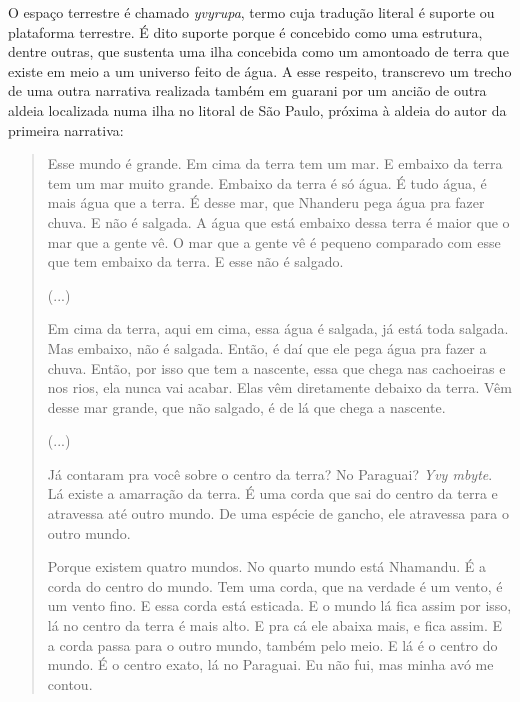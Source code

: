 O espaço terrestre é chamado \emph{yvyrupa}, termo cuja tradução literal
é suporte ou plataforma terrestre. É dito suporte porque é concebido
como uma estrutura, dentre outras, que sustenta uma ilha concebida como
um amontoado de terra que existe em meio a um universo feito de água. A
esse respeito, transcrevo um trecho de uma outra narrativa realizada
também em guarani por um ancião de outra aldeia localizada numa ilha no
litoral de São Paulo, próxima à aldeia do autor da primeira narrativa:

\begin{quote}
Esse mundo é grande. Em cima da terra tem um mar. E embaixo da terra tem
um mar muito grande. Embaixo da terra é só água. É tudo água, é mais
água que a terra. É desse mar, que Nhanderu pega água pra fazer chuva. E
não é salgada. A água que está embaixo dessa terra é maior que o mar que
a gente vê. O mar que a gente vê é pequeno comparado com esse que tem
embaixo da terra. E esse não é salgado.

(...)

Em cima da terra, aqui em cima, essa água é salgada, já está toda
salgada. Mas embaixo, não é salgada. Então, é daí que ele pega água pra
fazer a chuva. Então, por isso que tem a nascente, essa que chega nas
cachoeiras e nos rios, ela nunca vai acabar. Elas vêm diretamente
debaixo da terra. Vêm desse mar grande, que não salgado, é de lá que
chega a nascente.

(...)

Já contaram pra você sobre o centro da terra? No Paraguai? \emph{Yvy
mbyte}. Lá existe a amarração da terra. É uma corda que sai do centro da
terra e atravessa até outro mundo. De uma espécie de gancho, ele
atravessa para o outro mundo.

Porque existem quatro mundos. No quarto mundo está Nhamandu. É a corda
do centro do mundo. Tem uma corda, que na verdade é um vento, é um vento
fino. E essa corda está esticada. E o mundo lá fica assim por isso, lá
no centro da terra é mais alto. E pra cá ele abaixa mais, e fica assim.
E a corda passa para o outro mundo, também pelo meio. E lá é o centro do
mundo. É o centro exato, lá no Paraguai. Eu não fui, mas minha avó me
contou.
\end{quote}


